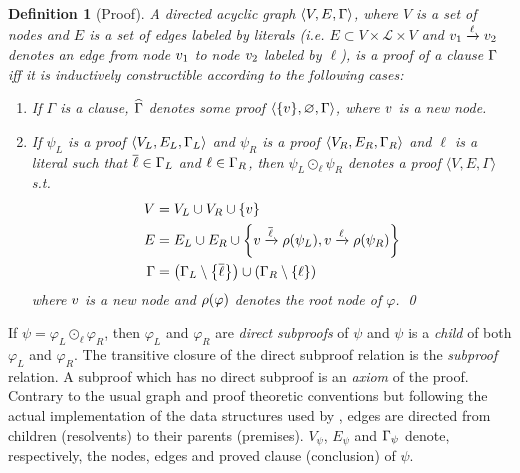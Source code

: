 \documentclass{easychair}
\newtheorem{definition}{Definition}
\begin{document}
\begin{definition}[Proof] 
\label{def:proof}
A directed acyclic graph $\langle V, E, \Gamma \rangle$, where $V$ is a set of nodes and $E$ is a
set of edges labeled by literals (i.e. $E \subset V \times \mathcal{L} \times V$ and $v_1
\xrightarrow{\ell} v_2$ denotes an edge from node $v_1$ to node $v_2$ labeled by $\ell$), is a
proof of a clause $\Gamma$ iff it is inductively constructible according to the following cases:
%
\begin{enumerate}
  \item If $\Gamma$ is a clause, $\widehat{\Gamma}$ denotes some proof $\langle \{ v \}, \varnothing,
    \Gamma \rangle$, where $v$ is a new node.
  \item If $\psi_L$ is a proof $\langle V_L, E_L, \Gamma_L \rangle$ and
    $\psi_R$ is a proof $\langle V_R, E_R, \Gamma_R \rangle$ and $\ell$ is a literal such that
    $\overline{\ell} \in \Gamma_L$ and $\ell \in \Gamma_R$, then
    $\psi_L \odot_\ell \psi_R$ denotes a proof $\langle V, E, \Gamma \rangle$ s.t.
    \begin{align*}
      V &= V_L \cup V_R \cup \{v \} \\
      E &= E_L \cup E_R \cup
                    \left\{ v \xrightarrow{\overline{\ell}} \rho(\psi_L), v \xrightarrow{\ell} \rho(\psi_R) \right\} \\
     \Gamma &= \left( \Gamma_L \setminus \left\{ \overline{\ell} \right\} \right) \cup \left( \Gamma_R
                    \setminus \left\{ \ell \right\} \right)
    \end{align*}
    where $v$ is a new node and $\rho(\varphi)$ denotes the root node of $\varphi$.
  \qed
\end{enumerate}
\end{definition}


\newcommand{\Vertices}[1]{V_{#1}}
\newcommand{\Edges}[1]{E_{#1}}
\newcommand{\Conclusion}[1]{\clause_{#1}}

\noindent
If $\psi = \varphi_L \odot_{\ell} \varphi_R$, then $\varphi_L$ and $\varphi_R$ are \emph{direct subproofs}
of $\psi$ and $\psi$ is a \emph{child} of both $\varphi_L$ and $\varphi_R$. The transitive closure of
the direct subproof relation is the \emph{subproof} relation. A subproof which has no direct
subproof is an \emph{axiom} of the proof. Contrary to the usual graph and proof theoretic conventions but following the actual implementation of the data structures used by \LowerUnivalents, edges are directed from children (resolvents) to their parents (premises).
%
$\Vertices{\psi}$, $\Edges{\psi}$ and $\Conclusion{\psi}$
denote, respectively, the nodes, edges and proved clause (conclusion) of $\psi$.
\end{document}
